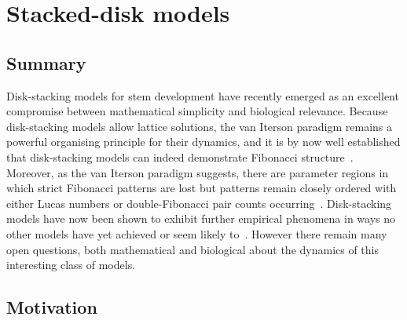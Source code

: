 
\chapter{Stacked-disk models}
\label{ch:stackeddisk}
\section*{Summary}
{
Disk-stacking models for stem development have recently emerged as an excellent compromise between mathematical simplicity and biological relevance. 
Because disk-stacking models allow lattice solutions,  the van Iterson paradigm remains a powerful organising principle for their dynamics, and it is by now well established that disk-stacking models can indeed demonstrate Fibonacci structure~\cite{goleFibonacciQuasisymmetricPhyllotaxis2016}. Moreover, as the van Iterson paradigm suggests, there are parameter regions in which strict Fibonacci patterns are lost but patterns remain closely ordered with either Lucas numbers or double-Fibonacci pair counts occurring~\cite{goleFibonacciQuasisymmetricPhyllotaxis2016,yonekuraMathematicalModelStudies2019}.
Disk-stacking models have now been shown to exhibit further empirical phenomena in ways no other models have yet achieved or seem likely to~\cite{swintonDiskstackingModelsAre2024}. However there remain many open questions, both mathematical and biological about the dynamics of this interesting class of models.
}



\section{Motivation}

